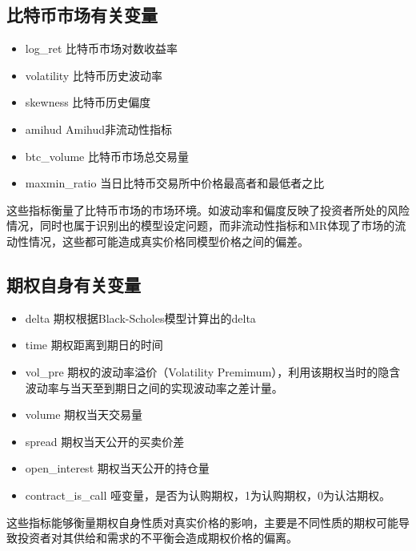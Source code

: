     \subsection{比特币市场有关变量}
    \begin{itemize}
        \item log\_ret 比特币市场对数收益率
        \item volatility 比特币历史波动率
        \item skewness 比特币历史偏度
        \item amihud Amihud非流动性指标
        \item btc\_volume 比特币市场总交易量
        \item maxmin\_ratio 当日比特币交易所中价格最高者和最低者之比
    \end{itemize}
    
    这些指标衡量了比特币市场的市场环境。如波动率和偏度反映了投资者所处的风险情况，同时也属于识别出的模型设定问题，而非流动性指标和MR体现了市场的流动性情况，这些都可能造成真实价格同模型价格之间的偏差。
    \subsection{期权自身有关变量}
    \begin{itemize}
        \item delta 期权根据Black-Scholes模型计算出的delta
        \item time 期权距离到期日的时间
        \item vol\_pre 期权的波动率溢价（Volatility Premimum），利用该期权当时的隐含波动率与当天至到期日之间的实现波动率之差计量。
        \item volume 期权当天交易量                                     
        \item spread 期权当天公开的买卖价差
        \item open\_interest 期权当天公开的持仓量
        \item contract\_is\_call 哑变量，是否为认购期权，1为认购期权，0为认沽期权。 
    \end{itemize}
    这些指标能够衡量期权自身性质对真实价格的影响，主要是不同性质的期权可能导致投资者对其供给和需求的不平衡会造成期权价格的偏离。
